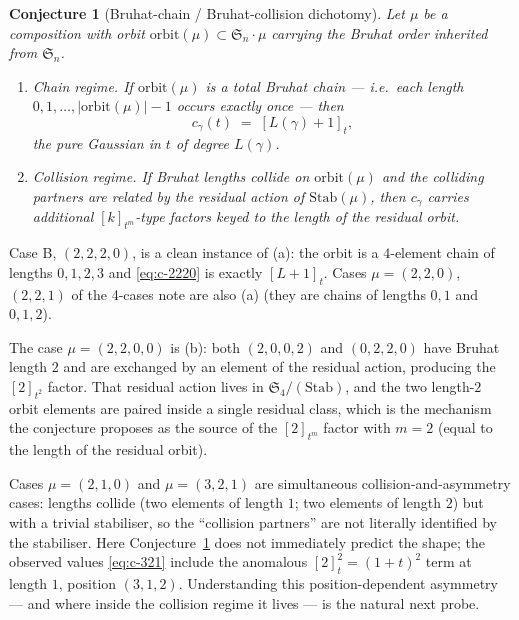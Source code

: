 \documentclass[11pt]{article}
\newtheorem{conjecture}[theorem]{Conjecture}
\theoremstyle{definition}
\theoremstyle{remark}
\newcommand{\Sn}{\mathfrak{S}_n}
\newcommand{\qint}[1]{[#1]_t}
\begin{document}
\begin{conjecture}[Bruhat-chain / Bruhat-collision dichotomy]
\label{conj:dichotomy}
Let $\mu$ be a composition with orbit $\mathrm{orbit}(\mu) \subset
\Sn \cdot \mu$ carrying the Bruhat order inherited from $\Sn$.
\begin{enumerate}
\item[(a)] \emph{Chain regime.} If $\mathrm{orbit}(\mu)$ is a total
           Bruhat chain --- i.e.\ each length
           $0, 1, \ldots, |\mathrm{orbit}(\mu)| - 1$ occurs
           exactly once --- then
           \[
              c_\gamma(t) \;=\; \qint{L(\gamma) + 1},
           \]
           the pure Gaussian in $t$ of degree $L(\gamma)$.
\item[(b)] \emph{Collision regime.} If Bruhat lengths collide on
           $\mathrm{orbit}(\mu)$ and the colliding partners are
           related by the residual action of $\mathrm{Stab}(\mu)$,
           then $c_\gamma$ carries additional $[k]_{t^m}$-type
           factors keyed to the length of the residual orbit.
\end{enumerate}
\end{conjecture}

Case B, $(2,2,2,0)$, is a clean instance of (a): the orbit is a
$4$-element chain of lengths $0, 1, 2, 3$ and \eqref{eq:c-2220}
is exactly $\qint{L+1}$. Cases $\mu = (2,2,0)$, $(2,2,1)$ of the
4-cases note are also (a) (they are chains of lengths $0,1$ and
$0, 1, 2$).

The case $\mu = (2,2,0,0)$ is (b): both $(2,0,0,2)$ and
$(0,2,2,0)$ have Bruhat length $2$ and are exchanged by an element
of the residual action, producing the $[2]_{t^2}$ factor. That
residual action lives in $\mathfrak{S}_4 / (\mathrm{Stab})$, and
the two length-$2$ orbit elements are paired inside a single
residual class, which is the mechanism the conjecture proposes as
the source of the $[2]_{t^m}$ factor with $m = 2$
(equal to the length of the residual orbit).

Cases $\mu = (2,1,0)$ and $\mu = (3,2,1)$ are simultaneous
collision-and-asymmetry cases: lengths collide (two elements of
length $1$; two elements of length $2$) but with a trivial
stabiliser, so the ``collision partners'' are not literally
identified by the stabiliser. Here Conjecture~\ref{conj:dichotomy}
does not immediately predict the shape; the observed values
\eqref{eq:c-321} include the anomalous $\qint{2}^2 = (1+t)^2$
term at length $1$, position $(3,1,2)$. Understanding this
position-dependent asymmetry --- and where inside the collision
regime it lives --- is the natural next probe.
\end{document}
